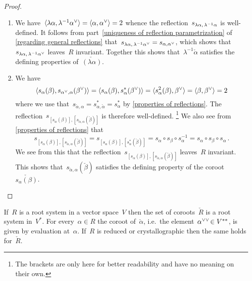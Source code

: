 \begin{proof}
  \leavevmode
  \begin{enumerate}
    \item
      We have~$\pair{\lambda \alpha, \lambda^{-1} \check{\alpha}} = \pair{\alpha, \check{\alpha}} = 2$ whence the reflection~$s_{\lambda \alpha, \, \lambda^{-1} \alpha}$ is well-defined.
      It follows from part~\ref*{uniqueness of reflection parametrization} of \cref{regarding general reflections} that~$s_{\lambda \alpha, \spacing \lambda^{-1} \check{\alpha}} = s_{\alpha, \check{\alpha}}$, which shows that~$s_{\lambda \alpha, \spacing \lambda^{-1} \check{\alpha}}$ leaves~$R$ invariant.
      Together this shows that~$\lambda^{-1} \check{\alpha}$ satisfies the defining properties of~$\check{(\lambda \alpha)}$.
    \item
      We have
      \[
        \pair{s_\alpha(\beta), s_{\check{\alpha}, \alpha}(\check{\beta})}
        =
        \pair{s_\alpha(\beta), s_\alpha^*(\check{\beta})}
        =
        \pair{s_\alpha^2(\beta), \check{\beta}}
        =
        \pair{\beta, \check{\beta}}
        =
        2
      \]
      where we use that~$s_{\check{\alpha}, \alpha}= s_{\alpha, \check{\alpha}}^* = s_\alpha^*$ by \cref{properties of reflections}.
      The reflection~$s_{[s_\alpha(\beta)], [s_{\check{\alpha}, \alpha}(\check{\beta})]}$ is therefore well-defined.%
      \footnote{The brackets are only here for better readability and have no meaning on their own.}
      We also see from \cref{properties of reflections} that
      \[
        s_{[s_\alpha(\beta)], [s_{\check{\alpha}, \alpha}(\check{\beta})]}
        =
        s_{[s_\alpha(\beta)], [s_\alpha^*(\check{\beta})]}
        =
        s_\alpha \circ s_\beta \circ s_\alpha^{-1} 
        =
        s_\alpha \circ s_\beta \circ s_\alpha \,.
      \]
      We see from this that the reflection~$s_{[s_\alpha(\beta)], [s_{\check{\alpha}, \alpha}(\check{\beta})]}$ leaves~$R$ invariant.
      This shows that~$s_{\check{\alpha}, \alpha}(\check{\beta})$ satisfies the defining property of the coroot~$\check{s_\alpha(\beta)}$.
    \qedhere
  \end{enumerate}
\end{proof}


\begin{theorem}
  \label{dual root system}
  If~$R$ is a root system in a vector space~$V$ then the set of coroots~$\check{R}$ is a root system in~$V^*$.
  For every~$\alpha \in R$ the coroot of~$\check{\alpha}$, i.e.\ the element~$\dcheck*{\alpha} \in V^{**}$, is given by evaluation at~$\alpha$.
  If~$R$ is reduced or crystallographic then the same holds for~$\check{R}$.
\end{theorem}


